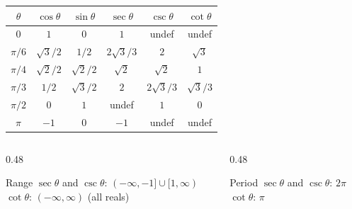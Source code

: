 \documentclass[aspectratio=169, 11pt]{beamer}
\begin{document}
\begin{frame}[t, plain]

  \renewcommand{\arraystretch}{1.4}
  \begin{center}
  \begin{tabular}{|c|c|c|c|c|c|}
  \hline
  $\theta$ & $\cos\theta$ & $\sin\theta$ & $\sec\theta$ & $\csc\theta$ & $\cot\theta$ \\
  \hline
  $0$ & $1$ & $0$ & $1$ & undef & undef \\
  $\pi/6$ & $\sqrt{3}/2$ & $1/2$ & $2\sqrt{3}/3$ & $2$ & $\sqrt{3}$ \\
  $\pi/4$ & $\sqrt{2}/2$ & $\sqrt{2}/2$ & $\sqrt{2}$ & $\sqrt{2}$ & $1$ \\
  $\pi/3$ & $1/2$ & $\sqrt{3}/2$ & $2$ & $2\sqrt{3}/3$ & $\sqrt{3}/3$ \\
  $\pi/2$ & $0$ & $1$ & undef & $1$ & $0$ \\
  $\pi$ & $-1$ & $0$ & $-1$ & undef & undef \\
  \hline
  \end{tabular}
  \end{center}

  \vspace{0.3cm}
  \begin{columns}[T]
    \begin{column}{0.48\textwidth}
      \begin{block}{Range}
        $\sec\theta$ and $\csc\theta$: $(-\infty,-1]\cup[1,\infty)$\\
        $\cot\theta$: $(-\infty,\infty)$ (all reals)
      \end{block}
    \end{column}
    \begin{column}{0.48\textwidth}
      \begin{block}{Period}
        $\sec\theta$ and $\csc\theta$: $2\pi$\\
        $\cot\theta$: $\pi$
      \end{block}
    \end{column}
  \end{columns}
\end{frame}
\end{document}
